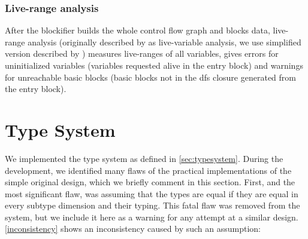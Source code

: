 \subsubsection{Live-range analysis}


After the blockifier builds the whole control flow graph and blocks data, live-range analysis (originally described by \citet{Aho2006compilers} as live-variable analysis, we use simplified version described by \citet{bednarek2008compilers}) measures live-ranges of all variables, gives errors for uninitialized variables (variables requested alive in the entry block) and warnings for unreachable basic blocks (basic blocks not in the dfs closure generated from the entry block).


\section{Type System}

We implemented the type system as defined in \cref{sec:typesystem}. During the development, we identified many flaws of the practical implementations of the simple original design, which we briefly comment in this section. First, and the most significant flaw, was assuming that the types are equal if they are equal in every subtype dimension and their typing. This fatal flaw was removed from the system, but we include it here as a warning for any attempt at a similar design. \cref{inconsistency} shows an inconsistency caused by such an assumption:

